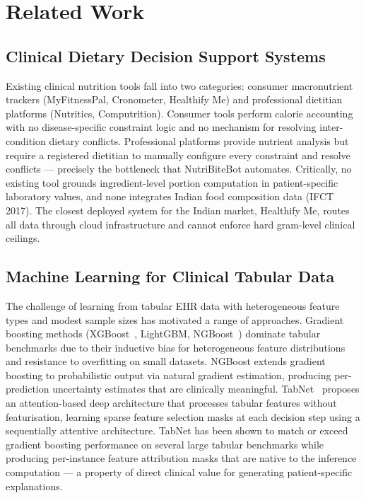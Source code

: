 \documentclass[journal]{IEEEtran}
\begin{document}
\section{Related Work}
\label{sec:related}

\subsection{Clinical Dietary Decision Support Systems}
Existing clinical nutrition tools fall into two categories: consumer
macronutrient trackers (MyFitnessPal, Cronometer, Healthify Me) and
professional dietitian platforms (Nutritics, Computrition). Consumer
tools perform calorie accounting with no disease-specific constraint
logic and no mechanism for resolving inter-condition dietary conflicts.
Professional platforms provide nutrient analysis but require a
registered dietitian to manually configure every constraint and resolve
conflicts --- precisely the bottleneck that NutriBiteBot automates.
Critically, no existing tool grounds ingredient-level portion
computation in patient-specific laboratory values, and none integrates
Indian food composition data (IFCT 2017). The closest deployed system
for the Indian market, Healthify Me, routes all data through cloud
infrastructure and cannot enforce hard gram-level clinical ceilings.

\subsection{Machine Learning for Clinical Tabular Data}
The challenge of learning from tabular EHR data with heterogeneous
feature types and modest sample sizes has motivated a range of
approaches. Gradient boosting methods (XGBoost~\cite{chen2016xgboost},
LightGBM, NGBoost~\cite{duan2020ngboost}) dominate tabular benchmarks
due to their inductive bias for heterogeneous feature distributions and
resistance to overfitting on small datasets. NGBoost extends gradient
boosting to probabilistic output via natural gradient estimation,
producing per-prediction uncertainty estimates that are clinically
meaningful. TabNet~\cite{arik2021tabnet} proposes an attention-based
deep architecture that processes tabular features without
featurisation, learning sparse feature selection masks at each decision
step using a sequentially attentive architecture. TabNet has been shown
to match or exceed gradient boosting performance on several large
tabular benchmarks while producing per-instance feature attribution
masks that are native to the inference computation --- a property of
direct clinical value for generating patient-specific explanations.
\end{document}
